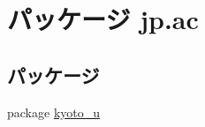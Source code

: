 \hypertarget{namespacejp_1_1ac}{\section{パッケージ jp.\-ac}
\label{namespacejp_1_1ac}
}
\subsection*{パッケージ}
\begin{DoxyCompactItemize}
\item 
package \hyperlink{namespacejp_1_1ac_1_1kyoto__u}{kyoto\-\_\-u}
\end{DoxyCompactItemize}
